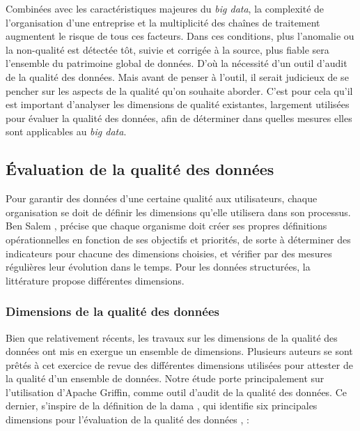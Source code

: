 Combin\'ees avec les caract\'eristiques majeures du \textit{big data}, la complexité de l’organisation d’une entreprise et la multiplicité des chaînes de traitement augmentent le risque de tous ces facteurs. Dans ces conditions, plus l’anomalie ou la non-qualité est détectée tôt, suivie et corrigée à la source, plus fiable sera l’ensemble du patrimoine global de données. D'o\`u la nécessité d'un outil d'audit de la qualit\'e des donn\'ees. Mais avant de penser \`a l'outil, il serait judicieux de se pencher sur les aspects de la qualit\'e qu'on souhaite aborder. C'est pour cela qu'il est important d'analyser les dimensions de qualité existantes, largement utilisées pour évaluer la qualité des données, afin de déterminer dans quelles mesures elles sont applicables au \textit{big data}. 





\subsection{\'Evaluation de la qualit\'e des donn\'ees}

Pour garantir des donn\'ees d'une certaine qualit\'e aux utilisateurs, chaque organisation se doit de d\'efinir les dimensions qu'elle utilisera dans son processus. Ben Salem \cite{bensalem}, pr\'ecise que chaque organisme doit créer ses propres définitions opérationnelles en fonction de ses objectifs et priorités, de sorte \`a déterminer des indicateurs pour chacune des dimensions choisies, et vérifier par des mesures régulières leur évolution dans le temps. 
Pour les données structurées, la littérature  propose diff\'erentes dimensions.


\subsubsection{\textbf{Dimensions de la qualit\'e des donn\'ees}}  
Bien que relativement r\'ecents, les travaux sur les dimensions de la qualit\'e des donn\'ees ont mis en exergue un ensemble de dimensions. Plusieurs auteurs se sont pr\^et\'es \`a cet exercice de revue des diff\'erentes dimensions utilis\'ees pour attester de la qualit\'e d'un ensemble de donn\'ees. Notre \'etude porte principalement sur l'utilisation d'Apache Griffin, comme outil d'audit de la qualit\'e des donn\'ees. Ce dernier, s'inspire de la définition de la \acrfull{dama} \cite{dama}, qui identifie six principales dimensions pour l'\'evaluation de la qualit\'e des donn\'ees \cite{dama}, \cite{ehrlinger2019survey} :

